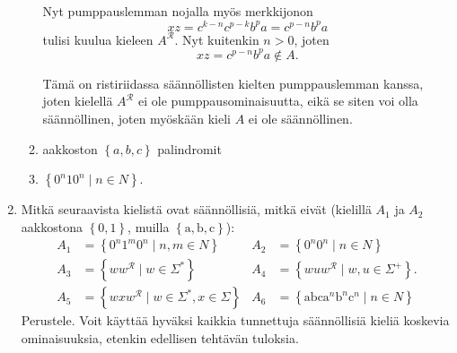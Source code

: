 \documentclass[a4paper,11pt]{article}
\newcommand{\set}[1]{{\left\{ #1 \right\}}}
\begin{document}
\begin{enumerate}
\begin{enumerate}
  Nyt pumppauslemman nojalla myös merkkijonon
  \begin{equation*}
    xz = c^{k-n}c^{p-k}b^pa = c^{p-n}b^pa
  \end{equation*}
  tulisi kuulua kieleen $A^\mathcal{R}$. Nyt kuitenkin $n > 0$, joten
  \begin{equation*}
    xz = c^{p-n}b^pa \notin A.
  \end{equation*}

  Tämä on ristiriidassa säännöllisten kielten pumppauslemman kanssa, joten
  kielellä $A^\mathcal{R}$ ei ole pumppausominaisuutta, eikä se siten voi olla
  säännöllinen, joten myöskään kieli $A$ ei ole säännöllinen.

\item
aakkoston $\set{a,b, c}$ palindromit
\item
$\set{0^n10^n\mid n\in N}$.
\end{enumerate}

\item
Mitkä seuraavista kielistä ovat säännöllisiä, mitkä
eivät (kielillä $A_1$ ja $A_2$ aakkostona $\set{0,1}$, muilla
$\set{\mathrm{a},\mathrm{b},\mathrm{c}}$):
\begin{align*}
A_1 &=\set{0^n1^m0^n\mid n,m\in N}
&A_2 &=\set{0^n0^n\mid n\in N}
\\
A_3 &=\set{ww^\mathcal{R}\mid w\in\Sigma^{\ast}}
&A_4 &=\set{wuw^\mathcal{R}\mid w,u\in\Sigma^+}.
\\
A_5 &=\set{wxw^\mathcal{R}\mid w\in\Sigma^{\ast},x\in\Sigma}
&A_6 &=\set{\mathrm{abc}\mathrm{a}^n\mathrm{b}^n\mathrm{c}^n\mid n\in N}
\end{align*}
Perustele.
Voit käyttää hyväksi kaikkia tunnettuja säännöllisiä
kieliä koskevia ominaisuuksia, etenkin edellisen tehtävän tuloksia.



%
%


\end{enumerate}
\end{document}
